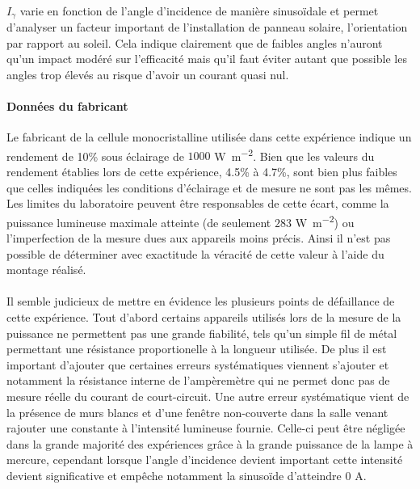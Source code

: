 \paragraph{}
\(I_\gamma\) varie en fonction de l'angle d'incidence de manière sinusoïdale et permet d'analyser un facteur important de l'installation de panneau solaire, l'orientation par rapport au soleil. Cela indique clairement que de faibles angles n'auront qu'un impact modéré sur l'efficacité mais qu'il faut éviter autant que possible les angles trop élevés au risque d'avoir un courant quasi nul.

\paragraph{Données du fabricant}
Le fabricant de la cellule monocristalline utilisée dans cette expérience indique un rendement de 10\% sous éclairage de \(1000\) \unit{\watt \per \square \meter}. Bien que les valeurs du rendement établies lors de cette expérience, 4.5\% à 4.7\%, sont bien plus faibles que celles indiquées les conditions d'éclairage et de mesure ne sont pas les mêmes. Les limites du laboratoire peuvent être responsables de cette écart, comme la puissance lumineuse maximale atteinte (de seulement \(283\) \unit{\watt \per \square \meter}) ou l'imperfection de la mesure dues aux appareils moins précis. Ainsi il n'est pas possible de déterminer avec exactitude la véracité de cette valeur à l'aide du montage réalisé.

\paragraph{}
Il semble judicieux de mettre en évidence les plusieurs points de défaillance de cette expérience. Tout d'abord certains appareils utilisés lors de la mesure de la puissance ne permettent pas une grande fiabilité, tels qu'un simple fil de métal permettant une résistance proportionelle à la longueur utilisée. De plus il est important d'ajouter que certaines erreurs systématiques viennent s'ajouter et notamment la résistance interne de l'ampèremètre qui ne permet donc pas de mesure réelle du courant de court-circuit. Une autre erreur systématique vient de la présence de murs blancs et d'une fenêtre non-couverte dans la salle venant rajouter une constante à l'intensité lumineuse fournie. Celle-ci peut être négligée dans la grande majorité des expériences grâce à la grande puissance de la lampe à mercure, cependant lorsque l'angle d'incidence devient important cette intensité devient significative et empêche notamment la sinusoïde d'atteindre \(0\) \unit{\ampere}.